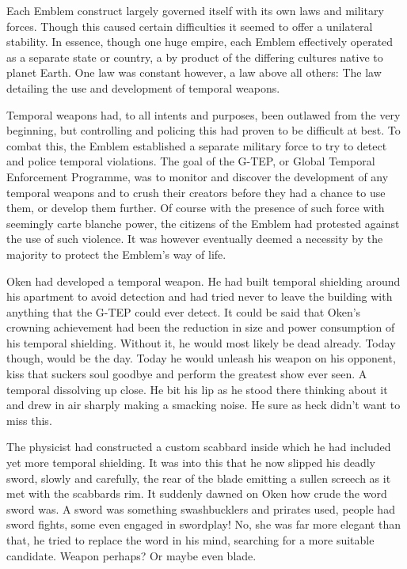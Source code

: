 Each Emblem construct largely governed itself with its own laws and military forces. Though this caused certain difficulties it seemed to offer a unilateral stability. In essence, though one huge empire, each Emblem effectively operated as a separate state or country, a by product of the differing cultures native to planet Earth. One law was constant however, a law above all others: The law detailing the use and development of temporal weapons.

Temporal weapons had, to all intents and purposes, been outlawed from the very beginning, but controlling and policing this had proven to be difficult at best. To combat this, the Emblem established a separate military force to try to detect and police temporal violations. The goal of the G-TEP, or Global Temporal Enforcement Programme, was to monitor and discover the development of any temporal weapons and to crush their creators before they had a chance to use them, or develop them further. Of course with the presence of such force with seemingly carte blanche power, the citizens of the Emblem had protested against the use of such violence. It was however eventually deemed a necessity by the majority to protect the Emblem's way of life.

Oken had developed a temporal weapon. He had built temporal shielding around his apartment to avoid detection and had tried never to leave the building with anything that the G-TEP could ever detect. It could be said that Oken's crowning achievement had been the reduction in size and power consumption of his temporal shielding. Without it, he would most likely be dead already. Today though, would be the day. Today he would unleash his weapon on his opponent, kiss that suckers soul goodbye and perform the greatest show ever seen. A temporal dissolving up close. He bit his lip as he stood there thinking about it and drew in air sharply making a smacking noise. He sure as heck didn't want to miss this.

The physicist had constructed a custom scabbard inside which he had included yet more temporal shielding. It was into this that he now slipped his deadly sword, slowly and carefully, the rear of the blade emitting a sullen screech as it met with the scabbards rim. It suddenly dawned on Oken how crude the word sword was. A sword was something swashbucklers and prirates used, people had sword fights, some even engaged in swordplay! No, she was far more elegant than that, he tried to replace the word in his mind, searching for a more suitable candidate. Weapon perhaps? Or maybe even blade.

